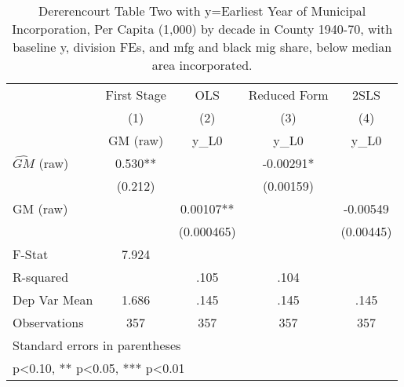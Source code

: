 \begin{table}[htbp]\centering
\def\sym#1{\ifmmode^{#1}\else\(^{#1}\)\fi}
\caption{Dererencourt Table Two with y=Earliest Year of Municipal Incorporation, Per Capita (1,000) by decade in County 1940-70, with baseline y, division FEs, and mfg and black mig share, below median area incorporated.}
\begin{tabular}{l*{4}{c}}
\toprule
                    & First Stage   &         OLS   &Reduced Form   &        2SLS   \\
                    &\multicolumn{1}{c}{(1)}&\multicolumn{1}{c}{(2)}&\multicolumn{1}{c}{(3)}&\multicolumn{1}{c}{(4)}\\
                    &\multicolumn{1}{c}{GM  (raw)}&\multicolumn{1}{c}{y\_L0}&\multicolumn{1}{c}{y\_L0}&\multicolumn{1}{c}{y\_L0}\\
\midrule
$\hat{GM}$ (raw)    &       0.530** &               &    -0.00291*  &               \\
                    &     (0.212)   &               &   (0.00159)   &               \\
\addlinespace
GM  (raw)           &               &     0.00107** &               &    -0.00549   \\
                    &               &  (0.000465)   &               &   (0.00445)   \\
\midrule
F-Stat              &       7.924   &               &               &               \\
R-squared           &               &        .105   &        .104   &               \\
Dep Var Mean        &       1.686   &        .145   &        .145   &        .145   \\
Observations        &         357   &         357   &         357   &         357   \\
\bottomrule
\multicolumn{5}{l}{\footnotesize Standard errors in parentheses}\\
\multicolumn{5}{l}{\footnotesize * p<0.10, ** p<0.05, *** p<0.01}\\
\end{tabular}
\end{table}

